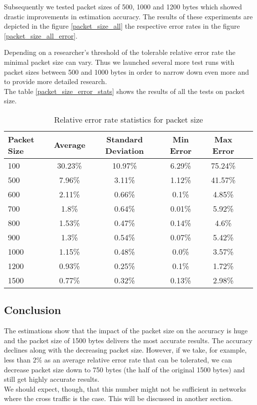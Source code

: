 Subsequently we tested packet sizes of 500, 1000 and 1200 bytes which showed drastic improvements in estimation accuracy. The results of these experiments are depicted in the figure \ref{packet_size_all} the respective error rates in the figure \ref{packet_size_all_error}. 


Depending on a researcher's threshold of the tolerable relative error rate the minimal packet size can vary. Thus we launched several more test runs with packet sizes between 500 and 1000 bytes in order to narrow down even more and to provide more detailed research. \\
The table \ref{packet_size_error_stats} shows the results of all the tests on packet size.

\begin{table}[h!]
  \centering
  \caption{Relative error rate statistics for packet size}
  \label{packet_size_error_stats}
\begin{tabular}{l|c|c|c|c|c}
\toprule
 Packet Size & Average & Standard Deviation & Min Error & Max Error \\ \midrule
  \label{}
    100  & 30.23\% & 10.97\% & 6.29\% & 75.24\% \\
    500  & 7.96\%  & 3.11\%  & 1.12\% & 41.57\% \\
    600  & 2.11\%  & 0.66\%  & 0.1\% & 4.85\% \\
    700  & 1.8\%   & 0.64\%  & 0.01\% & 5.92\% \\
    800  & 1.53\%  & 0.47\%  & 0.14\% & 4.6\% \\
    900  & 1.3\%   & 0.54\%  & 0.07\% & 5.42\% \\
    1000 & 1.15\%  & 0.48\%  & 0.0\% & 3.57\% \\
    1200 & 0.93\%  & 0.25\%  & 0.1\% & 1.72\% \\
    1500 & 0.77\%  & 0.32\%  & 0.13\% & 2.98\% \\ \bottomrule
  \end{tabular}      
\end{table}



\subsection*{Conclusion}
The estimations show that the impact of the packet size on the accuracy is huge and the packet size of 1500 bytes delivers the most accurate results. The accuracy declines along with the decreasing packet size. However, if we take, for example, less than 2\% as an average relative error rate that can be tolerated, we can decrease packet size down to 750 bytes (the half of the original 1500 bytes) and still get highly accurate results. \\
We should expect, though, that this number might not be sufficient in networks where the cross traffic is the case. This will be discussed in another section.



